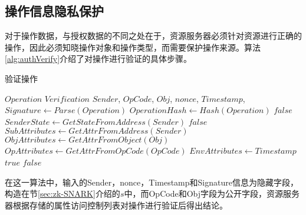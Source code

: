\subsection{操作信息隐私保护}

对于操作数据，与授权数据的不同之处在于，资源服务器必须针对资源进行正确的操作，因此必须知晓操作对象和操作类型，而需要保护操作来源。算法\ref{alg:authVerify}介绍了对操作进行验证的具体步骤。

 \begin{algorithm}
 \caption{验证操作}
   \begin{algorithmic}[H]\label{alg:opVerify}
   \renewcommand{\algorithmicrequire}{\textbf{Input:}}
   \renewcommand{\algorithmicensure}{\textbf{Output:}}
   \REQUIRE $Operation$
   \ENSURE  $Verification$
    \STATE $Sender$, $OpCode$, $Obj$, $nonce$, $Timestamp$, $Signature \gets Parse(Operation)$
    \STATE $OperationHash \gets Hash(Operation)$
      \RETURN $false$
    \ENDIF
    \STATE $SenderState \gets GetStateFromAddress(Sender)$
      \RETURN $false$
    \ENDIF
    \STATE$SubAttributes \gets GetAttrFromAddress(Sender)$
    \STATE$ObjAttributes \gets GetAttrFromObject(Obj)$
    \STATE$OpAttributes \gets GetAttrFromOpCode(OpCode)$
    \STATE$EnvAttributes \gets Timestamp$
        \RETURN $true$
      \ENDIF
    \ENDFOR
   \RETURN $false$
   \end{algorithmic}
 \end{algorithm}

在这一算法中，输入的Sender，nonce，Timestamp和Signature信息为隐藏字段，构造在节\ref{sec:zk-SNARK}介绍的$s$中，而OpCode和Obj字段为公开字段，资源服务器根据存储的属性访问控制列表对操作进行验证后得出结论。

